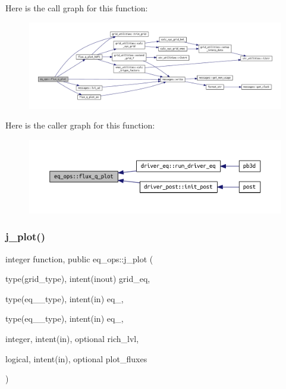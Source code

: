Here is the call graph for this function\+:
\nopagebreak
\begin{figure}[H]
\begin{center}
\leavevmode
\includegraphics[width=350pt]{namespaceeq__ops_af0effe20188d46a44680c2648e4572e9_cgraph}
\end{center}
\end{figure}
Here is the caller graph for this function\+:
\nopagebreak
\begin{figure}[H]
\begin{center}
\leavevmode
\includegraphics[width=350pt]{namespaceeq__ops_af0effe20188d46a44680c2648e4572e9_icgraph}
\end{center}
\end{figure}
\mbox{\label{namespaceeq__ops_af611fc0c83d1ab5ed8940d9a1a652d6c}} 
\subsubsection{\texorpdfstring{j\+\_\+plot()}{j\_plot()}}
{\footnotesize\ttfamily integer function, public eq\+\_\+ops\+::j\+\_\+plot (\begin{DoxyParamCaption}\item[{type(grid\+\_\+type), intent(inout)}]{grid\+\_\+eq,  }\item[{type(eq\+\_\+1\+\_\+type), intent(in)}]{eq\+\_,  }\item[{type(eq\+\_\+2\+\_\+type), intent(in)}]{eq\+\_,  }\item[{integer, intent(in), optional}]{rich\+\_\+lvl,  }\item[{logical, intent(in), optional}]{plot\+\_\+fluxes }\end{DoxyParamCaption})}



